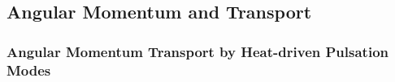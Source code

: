 
\subsection{Angular Momentum and Transport}


{\color{brown}
\subsubsection{Angular Momentum Transport by Heat-driven Pulsation Modes}





}


